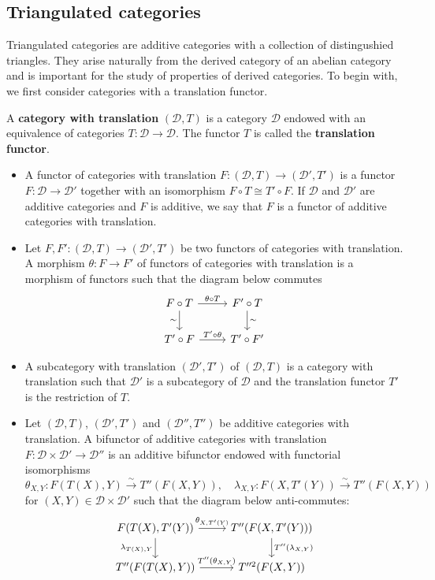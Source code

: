 \subsection{Triangulated categories}
Triangulated categories are additive categories with a collection of distingushied triangles. They arise naturally from the derived category of an abelian category and is important for the study of properties of derived categories. To begin with, we first consider categories with a translation functor.
\begin{definition}
A \textbf{category with translation} $(\mathcal{D},T)$ is a category $\mathcal{D}$ endowed with an equivalence of categories $T:\mathcal{D}\to\mathcal{D}$. The functor $T$ is called the \textbf{translation functor}.
\begin{itemize}
    \item A functor of categories with translation $F:(\mathcal{D},T)\to (\mathcal{D}',T')$ is a functor $F:\mathcal{D}\to\mathcal{D}'$ together with an isomorphism $F\circ T\cong T'\circ F$. If $\mathcal{D}$ and $\mathcal{D}'$ are additive categories and $F$ is additive, we say that $F$ is a functor of additive categories with translation.
    \item Let $F,F':(\mathcal{D},T)\to (\mathcal{D}',T')$ be two functors of categories with translation. A morphism $\theta:F\to F'$ of functors of categories with translation is a morphism of functors such that the diagram below commutes
    \[\begin{tikzcd}
    F\circ T\ar[r,"\theta\circ T"]\ar[d,swap,"\sim"]&F'\circ T\ar[d,"\sim"]\\
    T'\circ F\ar[r,"T'\circ\theta"]&T'\circ F'
    \end{tikzcd}\]
    \item A subcategory with translation $(\mathcal{D}',T')$ of $(\mathcal{D},T)$ is a category with translation such that $\mathcal{D}'$ is a subcategory of $\mathcal{D}$ and the translation functor $T'$ is the restriction of $T$.
    \item Let $(\mathcal{D},T)$, $(\mathcal{D}',T')$ and $(\mathcal{D}'',T'')$ be additive categories with translation. A bifunctor of additive categories with translation $F:\mathcal{D}\times\mathcal{D}'\to\mathcal{D}''$ is an additive bifunctor endowed with functorial isomorphisms
    \[\theta_{X,Y}:F(T(X),Y) \stackrel{\sim}{\to} T''(F(X,Y)),\quad \lambda_{X,Y}:F(X,T'(Y))\stackrel{\sim}{\to} T''(F(X,Y))\]
    for $(X,Y)\in\mathcal{D}\times\mathcal{D}'$ such that the diagram below anti-commutes:
    \[\begin{tikzcd}
    F(T(X),T'(Y))\ar[r,"\theta_{X,T'(Y)}"]\ar[d,swap,"\lambda_{T(X),Y}"]&T''(F(X,T'(Y)))\ar[d,"T''(\lambda_{X,Y})"]\\
    T''(F(T(X),Y))\ar[r,"T''(\theta_{X,Y})"]&T''^2(F(X,Y))
    \end{tikzcd}\]
\end{itemize}
\end{definition}

